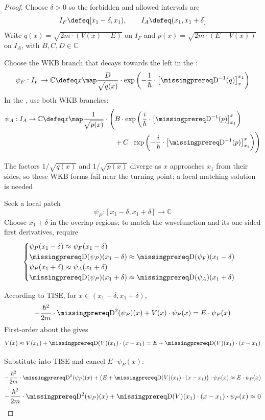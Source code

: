\documentclass[12pt]{article}
\begin{document}
\begin{proof}
  Choose $\delta>0$ so the forbidden and allowed intervals are
  \[
    I_F\defeq[x_1-\delta,x_1),\qquad
    I_A\defeq(x_1,x_1+\delta]
  \]
  Write $q(x)=\sqrt{2m\cdot(V(x)-E)}$ on $I_F$ and $p(x)=\sqrt{2m\cdot(E-V(x))}$ on $I_A$, with $B,C,D\in\mathbb C$

  Choose the WKB branch that decays towards the left in the :
  \[
    \psi_F:I_F\to\mathbb C\defeq x\map
    \frac{D}{\sqrt{q(x)}}\cdot
    \exp\left(-\frac1\hbar\cdot
      \left[\DiffOp^{-1}(q)\right]_{x}^{x_1}\right)
  \]
  In the , use both WKB branches:
  \[
    \begin{aligned}
      \psi_A:I_A\to\mathbb C\defeq x\map
      \frac1{\sqrt{p(x)}}\cdot\Biggl(&
        B\cdot\exp\left(\frac{i}{\hbar}\cdot
          \left[\DiffOp^{-1}(p)\right]_{x_1}^{x}\right)\\
        &+C\cdot\exp\left(-\frac{i}{\hbar}\cdot
          \left[\DiffOp^{-1}(p)\right]_{x_1}^{x}\right)\Biggr)
    \end{aligned}
  \]

  {\color{notesmissingprereq}The factors $1/\sqrt{q(x)}$ and $1/\sqrt{p(x)}$ diverge as $x$ approaches $x_1$ from their sides, so these WKB forms fail near the turning point; a local matching solution is needed}

  Seek a local patch
  \[
    \psi_P:[x_1-\delta,x_1+\delta]\to\mathbb C
  \]
  Choose $x_1\pm\delta$ in the overlap regions; to match the wavefunction and its one-sided first derivatives, require
  \[
    \begin{cases}
      \psi_P(x_1-\delta)\approx\psi_F(x_1-\delta)\\
      \DiffOp(\psi_P)(x_1-\delta)\approx\DiffOp(\psi_F)(x_1-\delta)\\
      \psi_P(x_1+\delta)\approx\psi_A(x_1+\delta)\\
      \DiffOp(\psi_P)(x_1+\delta)\approx\DiffOp(\psi_A)(x_1+\delta)
    \end{cases}
  \]

  According to TISE, for $x\in(x_1-\delta,x_1+\delta)$,
  \[
    -\frac{\hbar^2}{2m}\cdot\DiffOp^2(\psi_P)(x)
    +V(x)\cdot\psi_P(x)=E\cdot\psi_P(x)
  \]
  First-order  about the  gives
  \[
    V(x)\approx V(x_1)+\DiffOp(V)(x_1)\cdot(x-x_1)
    =E+\DiffOp(V)(x_1)\cdot(x-x_1)
  \]

  Substitute into TISE and cancel $E\cdot\psi_P(x)$:
  \[
    -\frac{\hbar^2}{2m}\cdot\DiffOp^2(\psi_P)(x)
    +\bigl(E+\DiffOp(V)(x_1)\cdot(x-x_1)\bigr)\cdot\psi_P(x)
    \approx E\cdot\psi_P(x)
  \]
  \[
    -\frac{\hbar^2}{2m}\cdot\DiffOp^2(\psi_P)(x)
    +\DiffOp(V)(x_1)\cdot(x-x_1)\cdot\psi_P(x)\approx0
  \]


\end{proof}
\end{document}
